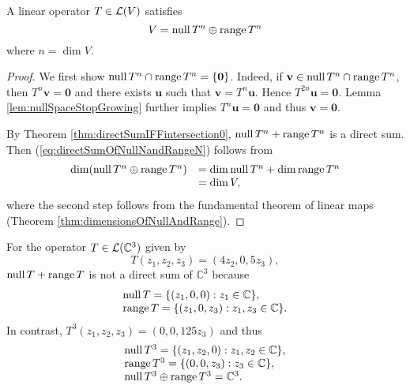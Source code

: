 \begin{thm}
  \label{thm:directSumOfNullNandRangeN}
  A linear operator $T\in {\cal L}(V)$ satisfies
  \begin{equation}
    \label{eq:directSumOfNullNandRangeN}
    V = \mathrm{null}\,T^n \oplus \mathrm{range}\, T^{n}
  \end{equation}
  where $n=\dim V$.
\end{thm}
\begin{proof}
  We first show
  $\mathrm{null}\,T^n \cap \mathrm{range}\, T^{n}=\{\mathbf{0}\}$.
  Indeed, if $\mathbf{v}\in \mathrm{null}\,T^n \cap \mathrm{range}\, T^{n}$,
  then $T^n\mathbf{v}=\mathbf{0}$
  and there exists $\mathbf{u}$ such that $\mathbf{v}=T^n \mathbf{u}$.
  Hence $T^{2n}\mathbf{u}=\mathbf{0}$.
  Lemma \ref{lem:nullSpaceStopGrowing} further implies
  $T^{n}\mathbf{u}=\mathbf{0}$ and thus $\mathbf{v}=\mathbf{0}$.

  By Theorem \ref{thm:directSumIFFintersection0},
  $\mathrm{null}\,T^n + \mathrm{range}\, T^{n}$ is a direct sum.
  Then (\ref{eq:directSumOfNullNandRangeN}) follows from
  \begin{displaymath}
    \begin{array}{rl}
    \dim(\mathrm{null}\,T^n \oplus \mathrm{range}\, T^{n})
      &= \dim \mathrm{null}\,T^n + \dim \mathrm{range}\, T^{n} \\
      &=\dim V,
    \end{array}
  \end{displaymath}
  where the second step follows
  from the fundamental theorem of linear maps
  (Theorem \ref{thm:dimensionsOfNullAndRange}).
\end{proof}

\begin{exm}
  For the operator $T\in {\cal L}(\mathbb{C}^3)$ given by
  \begin{equation}
    \label{eq:generalizedEigenvectorExmT}
    T(z_1, z_2, z_3) = (4z_2, 0, 5z_3),
  \end{equation}
  $\mathrm{null}\, T+ \mathrm{range}\, T$ is not a direct sum of $\mathbb{C}^3$
  because
  \begin{displaymath}
    \begin{array}{l}
      \mathrm{null}\, T = \{(z_1, 0, 0): z_1\in \mathbb{C}\},
      \\
      \mathrm{range}\, T = \{(z_1, 0, z_3): z_1,z_3\in \mathbb{C}\}.
    \end{array}
  \end{displaymath}
  In contrast, $T^3(z_1, z_2, z_3) = (0, 0, 125z_3)$
  and thus
  \begin{displaymath}
    \begin{array}{l}
      \mathrm{null}\, T^3 = \{(z_1, z_2, 0): z_1, z_2\in \mathbb{C}\},
      \\
      \mathrm{range}\, T^3 = \{(0, 0, z_3): z_3\in \mathbb{C}\},
      \\
      \mathrm{null}\, T^3 \oplus \mathrm{range}\, T^3 = \mathbb{C}^3.
    \end{array}
  \end{displaymath}
\end{exm}

